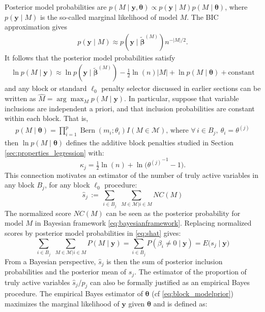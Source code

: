 \documentclass[aos]{imsart}
\theoremstyle{plain}
\newcommand{\M}{\mathcal{M}}
\newcommand{\bs}{\boldsymbol}
\begin{document}
Posterior model probabilities are $p(M \mid \bs y, \bs \theta) \propto p(\bs y \mid M) p(M \mid \bs \theta)$, where $p(\bs y \mid M)$ is the so-called marginal likelihood of model $M$. The BIC approximation \citep{BIC} gives
\begin{eqnarray*}
 p( \bs y  \mid M)\approx p(\bs y \mid \tilde{\bs \beta}^{(M)})n^{-|M|/2}.
\end{eqnarray*}
It follows that the posterior model probabilities satisfy
\begin{eqnarray*}
\ln p(M \mid\bs y) \approx \ln p(\bs y \mid \tilde{\bs \beta}^{(M)}) - \frac{1}{2}\ln(n)|M| + \ln p(M\mid\bs \theta) + \text{constant}
\end{eqnarray*}
and any block or standard $\ell_0$ penalty selector discussed in earlier sections can be written as $\hat{M}= \arg\max_M p(M \mid \bs y)$. 
In particular, suppose that variable inclusions are independent a priori, and that inclusion probabilities are constant within each block. That is,
\begin{eqnarray} \label{eq:block_modelprior}
p( M \mid \boldsymbol{\theta})=
        \prod_{i=1}^p \operatorname{Bern}\left(m_i ; \theta_i\right) I(M \in \M) \mbox{, where } \forall \, i\in B_j, \: \theta_i=\theta^{(j)}
\end{eqnarray}
then $\ln p(M \mid \bs \theta)$ defines the additive block penalties studied in Section \ref{sec:properties_legression} with:
\begin{equation}\label{eq:blockpenpriorinclu}
    \kappa_j=\tfrac{1}{2}\ln(n)+\ln\big({\theta^{(j)}}^{-1}-1\big).
\end{equation}
This connection motivates an estimator of the number of truly active variables in any block $B_j$, for any block $\ell_0$ procedure:
\begin{equation}\label{eq:shat}
    \widehat{s}_j \,:=\, \sum_{i\in B_j}\,\,\sum_{M\in \M | i \in M}NC(M)
\end{equation}
The normalized score $NC(M)$ can be seen as the posterior probability for model $M$ in Bayesian framework \eqref{eq:bayesianframework}. Replacing normalized scores  by posterior model probabilities in \eqref{eq:shat} gives:
\begin{equation*}
    \sum_{i\in B_j}\,\,\sum_{M\in \M | i \in M}P(M\mid \bs y) = \sum_{i\in B_j}P(\beta_i \neq 0 \mid \bs y) = E\big(s_j \mid \bs y\big)
\end{equation*}
From a Bayesian perspective, $\widehat{s}_j$ is then the sum of posterior inclusion probabilities and the posterior mean of $s_j$. The estimator of the proportion of truly active variables $\widehat{s}_j/p_j$ can also be formally justified as an empirical Bayes procedure. The empirical Bayes estimator of $\bs \theta$ (cf \eqref{eq:block_modelprior}) maximizes the marginal likelihood of $\bs y$ given $\bs \theta$ and is defined as:
\end{document}
